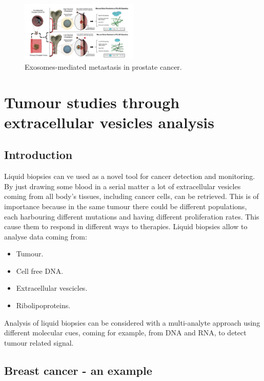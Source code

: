        \begin{figure}[H]
            \centering
            \includegraphics[width=0.5\textwidth]{cancer1.png}
            \caption{Exosomes-mediated metastasis in prostate cancer.}
            \label{fig:ev-prostate}
        \end{figure}

\section{Tumour studies through extracellular vesicles analysis}

    \subsection{Introduction}
    Liquid biopsies can ve used as a novel tool for cancer detection and monitoring.
    By just drawing some blood in a serial matter a lot of extracellular vesicles coming from all body's tissues, including cancer cells, can be retrieved.
    This is of importance because in the same tumour there could be different populations, each harbouring different mutations and having different proliferation rates.
    This cause them to respond in different ways to therapies.
    Liquid biopsies allow to analyse data coming from:

    \begin{multicols}{2}
        \begin{itemize}
            \item Tumour.
            \item Cell free DNA.
            \item Extracellular vescicles.
            \item Ribolipoproteins.
        \end{itemize}
    \end{multicols}

    Analysis of liquid biopsies can be considered with a multi-analyte approach using different molecular cues, coming for example, from DNA and RNA, to detect tumour related signal.

    \subsection{Breast cancer - an example}

